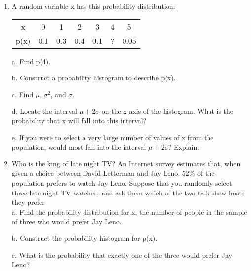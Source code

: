 \documentclass{article}
\begin{document}
\begin{enumerate}
\item A random variable x has this probability distribution: \\
\begin{center}
    \begin{tabular}{|c|c|c|c|c|c|c|}
        \hline
        x & 0 & 1 & 2 & 3 & 4 & 5\\
        p(x) & 0.1 & 0.3 & 0.4 & 0.1 & ? & 0.05 \\
        \hline
    \end{tabular}
\end{center}

a. Find p(4).

b. Construct a probability histogram to describe p(x).

c. Find $\mu$, $\sigma^2$, and $\sigma$.

d. Locate the interval $\mu \pm 2\sigma$ on the x-axis of the histogram. What is the probability that x will fall into this interval?

e. If you were to select a very large number of values of x from the population, would most fall into the interval $\mu \pm 2\sigma$? Explain.

\item Who is the king of late night TV? An Internet survey estimates that, when given a choice between David Letterman and Jay Leno, 52\% of the population prefers to watch Jay Leno. Suppose that you randomly select three late night TV watchers and ask them which of the two talk show hosts they prefer\\
a. Find the probability distribution for x, the number of people in the sample of three who would prefer Jay Leno.

b. Construct the probability histogram for p(x).

c. What is the probability that exactly one of the three would prefer Jay Leno?


\end{enumerate}
\end{document}
